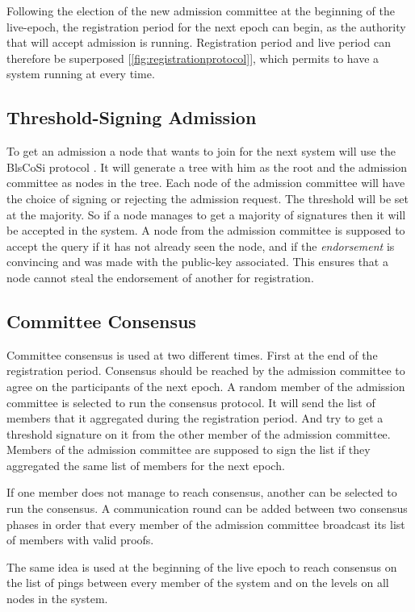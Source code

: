 \documentclass[a4paper,11pt,oneside]{report}
\begin{document}
Following the election of the new admission committee at the beginning of the
live-epoch, the registration period for the next epoch can begin, as the
authority that will accept admission is running. Registration period and live
period can therefore be superposed [\autoref{fig:registrationprotocol}], which
permits to have a system running at every time. 

\subsection{Threshold-Signing Admission}
To get an admission a node that wants to join for the next system will use the
BlsCoSi protocol \cite{Boneh2018}. It will generate a tree with him as
the root and the admission committee as nodes in the tree. Each node of the
admission committee will have the choice of signing or rejecting the admission
request. The threshold will be set at the majority. So if a node manages to get a
majority of signatures then it will be accepted in the system. A node from the
admission committee is supposed to accept the query if it has not already seen
the node, and if the \textit{endorsement} is convincing and was made with the public-key
associated. This ensures that a node cannot steal the endorsement of another
for registration.  

\subsection{Committee Consensus}
Committee consensus is used at two different times. First at the end of the
registration period. Consensus should be reached by the admission committee to agree on
the participants of the next epoch. A random member of the admission committee
is selected to run the consensus protocol. It will send the list of members
that it aggregated during the registration period. And try to get a threshold
signature on it from the other member of the admission committee. Members of
the admission committee are supposed to sign the list if they aggregated the
same list of members for the next epoch.

If one member does not manage to reach consensus, another can be selected to
run the consensus. A communication round can be added between two consensus
phases in order that every member of the admission committee broadcast its list
of members with valid proofs.

The same idea is used at the beginning of the live epoch to reach consensus on
the list of pings between every member of the system and on the levels on all
nodes in the system.
\end{document}
